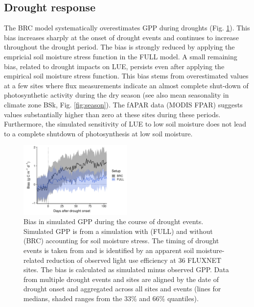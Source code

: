 \documentclass{myreport}
\begin{document}
\subsection{Drought response}
\label{sec:results_droughtresponse}

The BRC model systematically overestimates GPP during droughts (Fig. \ref{fig:modobs_droughtresponse}). This bias increases sharply at the onset of drought events and continues to increase throughout the drought period. The bias is strongly reduced by applying the empricial soil moisture stress function in the FULL model. A small remaining bias, related to drought impacts on LUE, persists even after applying the empirical soil moisture stress function. This bias stems from overestimated values at a few sites where flux measurements indicate an almost complete shut-down of photosynthetic activity during the dry season (see also mean seasonality in climate zone BSk, Fig. \ref{fig:season}). The fAPAR data (MODIS FPAR) suggests values substantially higher than zero at these sites during these periods. Furthermore, the simulated sensitivity of LUE to low soil moisture does not lead to a complete shutdown of photosynthesis at low soil moisture.

\begin{figure}[!ht]
    \centering
\includegraphics[width=0.5\textwidth]{fig/droughtresponse.pdf}
    \caption{Bias in simulated GPP during the course of drought events. Simulated GPP is from a simulation with (FULL) and without (BRC) accounting for soil moisture stress. The timing of drought events is taken from \citet{stocker18newphyt} and is identified by an apparent soil moisture-related reduction of observed light use efficiency at 36 FLUXNET sites. The bias is calculated as simulated minus observed GPP. Data from multiple drought events and sites are aligned by the date of drought onset and aggregated across all sites and events (lines for medians, shaded ranges from the 33\% and 66\% quantiles).}
    \label{fig:modobs_droughtresponse}
\end{figure}
\end{document}
